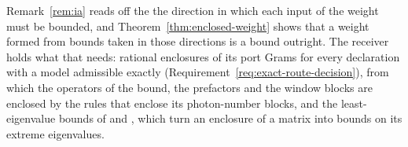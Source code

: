 
Remark~\ref{rem:ia} reads off the  the direction in which each
input of the weight must be bounded, and Theorem~\ref{thm:enclosed-weight}
shows that a weight formed from bounds taken in those directions is a bound
outright. The receiver holds what that needs: rational enclosures of its port
Grams for every declaration with a model admissible exactly
(Requirement~\ref{req:exact-route-decision}), from which the operators of the
bound, the prefactors and the window blocks are enclosed by the rules that
enclose its photon-number blocks, and the least-eigenvalue bounds of
 and
, which turn an
enclosure of a matrix into bounds on its extreme eigenvalues.


